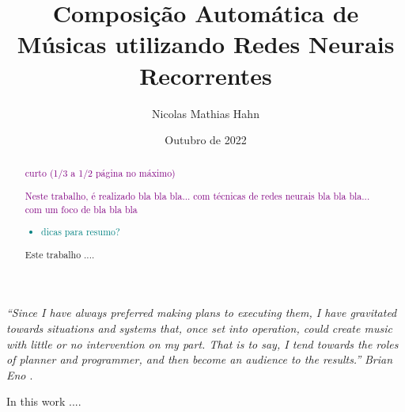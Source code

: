 \documentclass{automatextcc}
\newcommand{\obs}[1]{\textcolor{purple}{#1}}
\newcommand{\nico}[1]{\textcolor{teal}{#1}}
\begin{document}
\title{Composição Automática de Músicas utilizando Redes Neurais Recorrentes}
\author{Nicolas Mathias Hahn}



\dept{\DEST}

\date{Outubro de 2022}


\maketitulo

\makefolhaderosto

\makefolhadeaprovacaoA %


\newpage
\vspace*{\fill}
\begin{flushright} %
	\textit{``Since I have always preferred making plans to executing them, I have gravitated towards situations and systems that, once set into operation, could create music with little or no intervention on my part. That is to say, I tend towards the roles of planner and programmer, and then become an audience to the results.''} \newline
	\textit{Brian Eno \citep{alpern1995}}.
\end{flushright}



\begin{abstract}

\obs{curto (1/3 a 1/2 página no máximo)}

\obs{Neste trabalho, é realizado bla bla bla... com técnicas de redes neurais bla bla bla... com um foco de bla bla bla}

\nico{
\begin{itemize}
    \item dicas para resumo?
\end{itemize}
}

Este trabalho ....
\end{abstract}
\begin{englishabstract}
In this work ....
\end{englishabstract}
\end{document}
